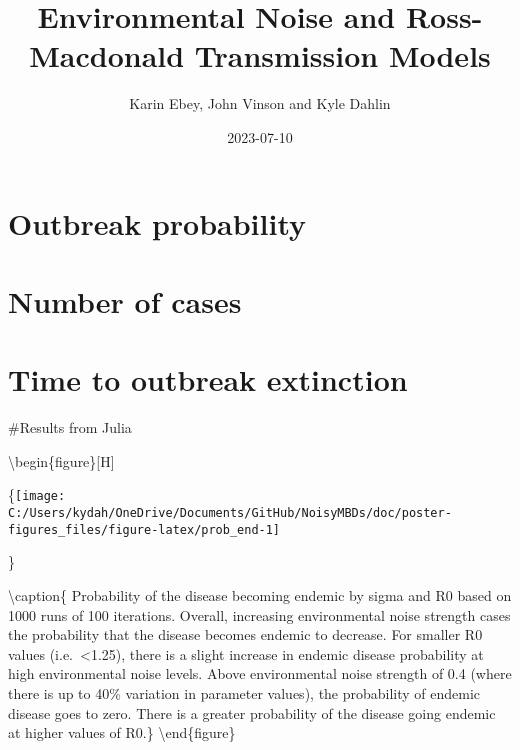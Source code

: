 \documentclass[
]{article}
\title{Environmental Noise and Ross-Macdonald Transmission Models}
\author{Karin Ebey, John Vinson and Kyle Dahlin}
\date{2023-07-10}
\begin{document}
\maketitle

\hypertarget{outbreak-probability}{%
\section{Outbreak probability}\label{outbreak-probability}}

\hypertarget{number-of-cases}{%
\section{Number of cases}\label{number-of-cases}}

\hypertarget{time-to-outbreak-extinction}{%
\section{Time to outbreak
extinction}\label{time-to-outbreak-extinction}}

\#Results from Julia

\textbackslash begin\{figure\}{[}H{]}

\{\centering \texttt{[image: C:/Users/kydah/OneDrive/Documents/GitHub/NoisyMBDs/doc/poster-figures\_files/figure-latex/prob\_end-1]}

\}

\textbackslash caption\{\label{fig:SDEprob_end} Probability of the
disease becoming endemic by sigma and R0 based on 1000 runs of 100
iterations. Overall, increasing environmental noise strength cases the
probability that the disease becomes endemic to decrease. For smaller R0
values (i.e.~\textless1.25), there is a slight increase in endemic
disease probability at high environmental noise levels. Above
environmental noise strength of 0.4 (where there is up to 40\% variation
in parameter values), the probability of endemic disease goes to zero.
There is a greater probability of the disease going endemic at higher
values of R0.\}\label{fig:prob_end} \textbackslash end\{figure\}
\end{document}
